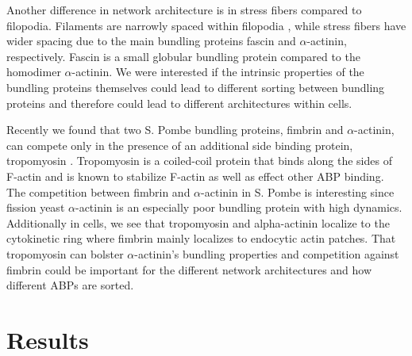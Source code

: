 Another difference in network architecture is in stress fibers compared to filopodia. Filaments are narrowly spaced within filopodia \citep{mattila_filopodia:_2008}, while stress 
fibers have wider spacing due to the main bundling proteins fascin and 
$\alpha$-actinin, respectively. Fascin is a small globular bundling protein compared to the homodimer $\alpha$-actinin. We were interested if the intrinsic properties of the bundling proteins themselves could lead to different sorting between bundling proteins and therefore could lead to different architectures within cells. 

Recently we found that two S. Pombe bundling proteins, fimbrin and $\alpha$-actinin, can compete only in the presence of an additional side binding protein, tropomyosin \citep{christensen_competition_2017}. Tropomyosin is a coiled-coil protein that binds along the sides of F-actin and is known to stabilize F-actin as well as effect other ABP binding. The competition between fimbrin and $\alpha$-actinin in S. Pombe is interesting since fission yeast $\alpha$-actinin is an especially poor bundling protein with high dynamics. Additionally in cells, we see that tropomyosin and alpha-actinin localize to the cytokinetic ring where fimbrin mainly localizes to endocytic actin patches. That tropomyosin can bolster $\alpha$-actinin’s bundling properties and competition against fimbrin could be important for the different network architectures and how different ABPs are sorted. 

\section{Results}\label{bundlers-results}

